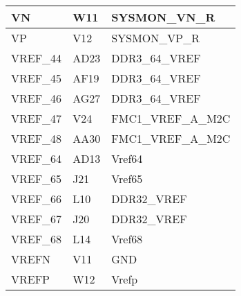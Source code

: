 \begin{footnotesize}
\begin{longtable}{|p{7cm}|p{1cm}|p{5cm}|}
VN	&	W11	&	SYSMON\_VN\_R	\\ \hline
VP	&	V12	&	SYSMON\_VP\_R	\\ \hline
VREF\_44	&	AD23	&	DDR3\_64\_VREF	\\ \hline
VREF\_45	&	AF19	&	DDR3\_64\_VREF	\\ \hline
VREF\_46	&	AG27	&	DDR3\_64\_VREF	\\ \hline
VREF\_47	&	V24	&	FMC1\_VREF\_A\_M2C	\\ \hline
VREF\_48	&	AA30	&	FMC1\_VREF\_A\_M2C	\\ \hline
VREF\_64	&	AD13	&	Vref64	\\ \hline
VREF\_65	&	J21	&	Vref65	\\ \hline
VREF\_66	&	L10	&	DDR32\_VREF	\\ \hline
VREF\_67	&	J20	&	DDR32\_VREF	\\ \hline
VREF\_68	&	L14	&	Vref68	\\ \hline
VREFN	&	V11	&	GND	\\ \hline
VREFP	&	W12	&	Vrefp	\\ \hline


		
\end{longtable}
\end{footnotesize}